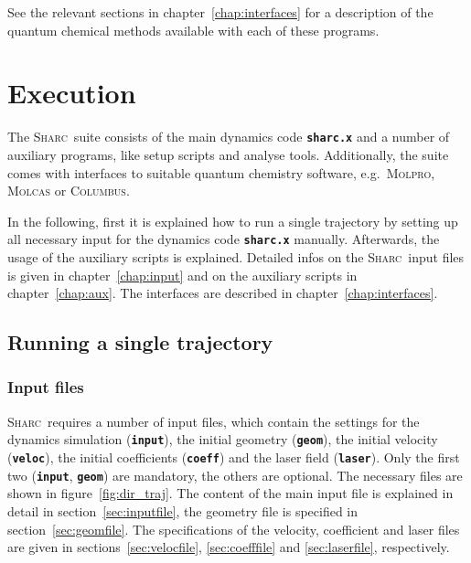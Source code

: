 \documentclass[a4paper,11pt,DIV=15,openany,twoside=false]{scrbook}
\newcommand{\sharc}{\textsc{Sharc}}
\newcommand{\ttt}[1]{\textbf{\texttt{#1}}}
\begin{document}
See the relevant sections in chapter~\ref{chap:interfaces} for a description of the quantum chemical methods available with each of these programs.


\chapter{Execution}

The \sharc\ suite consists of the main dynamics code \ttt{sharc.x} and a number of auxiliary programs, like setup scripts and analyse tools. Additionally, the suite comes with interfaces to suitable quantum chemistry software, e.g.\ \textsc{Molpro}, \textsc{Molcas} or \textsc{Columbus}. 

In the following, first it is explained how to run a single trajectory by setting up all necessary input for the dynamics code \ttt{sharc.x} manually. Afterwards, the usage of the auxiliary scripts is explained. Detailed infos on the \sharc\ input files is given in chapter~\ref{chap:input} and on the auxiliary scripts in chapter~\ref{chap:aux}. The interfaces are described in chapter~\ref{chap:interfaces}.

\section{Running a single trajectory}

\subsection{Input files}

\sharc\ requires a number of input files, which contain the settings for the dynamics simulation (\ttt{input}), the initial geometry (\ttt{geom}), the initial velocity (\ttt{veloc}), the initial coefficients (\ttt{coeff}) and the laser field (\ttt{laser}). Only the first two (\ttt{input}, \ttt{geom}) are mandatory, the others are optional. The necessary files are shown in figure~\ref{fig:dir_traj}. 
The content of the main input file is explained in detail in section~\ref{sec:inputfile}, the geometry file is specified in section~\ref{sec:geomfile}. The specifications of the velocity, coefficient and laser files are given in sections~\ref{sec:velocfile}, \ref{sec:coefffile} and \ref{sec:laserfile}, respectively.
\end{document}
